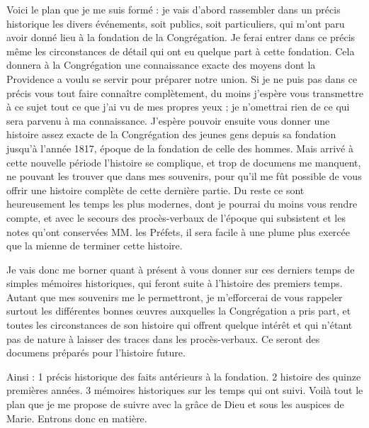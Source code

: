 Voici le plan que je me suis formé : je vais d'abord rassembler dans un précis historique les divers événements, soit publics, soit particuliers, qui m'ont paru avoir donné lieu à la fondation de la Congrégation. Je ferai entrer dans ce précis même les circonstances de détail qui ont eu quelque part à cette fondation. Cela donnera à la Congrégation une connaissance exacte des moyens dont la Providence a voulu se servir pour préparer notre union. Si je ne puis pas dans ce précis vous tout faire connaître complètement, du moins j'espère vous transmettre à ce sujet tout ce que j'ai vu de mes propres yeux ; je n'omettrai rien de ce qui sera parvenu à ma connaissance. J'espère pouvoir ensuite vous donner une histoire assez exacte de la Congrégation des jeunes gens depuis sa fondation jusqu'à l'année 1817, époque de la fondation de celle des hommes. Mais arrivé à cette nouvelle période l'histoire se complique, et trop de documens me manquent, ne pouvant les trouver que dans mes souvenirs, pour qu'il me
fût possible de vous offrir une histoire complète de cette dernière partie. Du reste ce sont heureusement les temps les plus modernes, dont je pourrai du moins vous rendre compte, et avec le secours des procès-verbaux de l'époque qui subsistent et les notes qu'ont conservées MM. les Préfets, il sera facile à une plume plus exercée que la mienne de terminer cette histoire.

Je vais donc me borner quant à présent à vous donner sur ces derniers temps de simples mémoires historiques, qui feront suite à l'histoire des premiers temps. Autant que mes souvenirs me le permettront, je m'efforcerai de vous rappeler surtout les différentes bonnes œuvres auxquelles la Congrégation a pris part, et toutes les circonstances de son histoire qui offrent quelque intérêt et qui n'étant pas de nature à laisser des traces dans les procès-verbaux. Ce seront des documens préparés pour l'histoire future.

Ainsi : 1 précis historique des faits antérieurs à la fondation. 2 histoire des quinze premières années. 3 mémoires historiques sur les temps qui ont suivi. Voilà tout le plan que je me propose de suivre avec la grâce de Dieu et sous les auspices de Marie. Entrons donc en matière.
